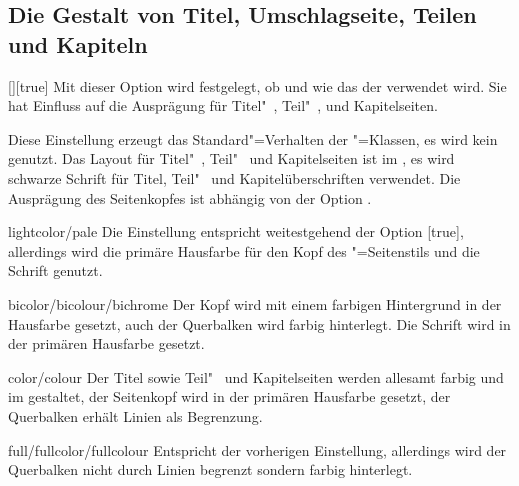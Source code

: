 \subsection{Die Gestalt von Titel, Umschlagseite, Teilen und Kapiteln}
\begin{Declaration}{[\PSet]}[true]
\printdeclarationlist%
%
%
Mit dieser Option wird festgelegt, ob und wie das \CD der \TnUD verwendet wird. 
Sie hat Einfluss auf die Ausprägung für Titel"~, Teil"~, und Kapitelseiten.
%
\begin{values}
\itemfalse
  Diese Einstellung erzeugt das Standard"=Verhalten der \KOMAScript"=Klassen, 
  es wird kein \CD genutzt.
  Das Layout für Titel"~, Teil"~ und Kapitelseiten ist im \CD, es wird 
  schwarze Schrift für Titel, Teil"~ und Kapitelüberschriften verwendet. Die 
  Ausprägung des Seitenkopfes ist abhängig von der Option .
\item[lightcolor/pale]
  Die Einstellung entspricht weitestgehend der Option [true], 
  allerdings wird die primäre Hausfarbe  für den Kopf des 
  "=Seitenstils und die Schrift genutzt.
\item[bicolor/bicolour/bichrome]
   Der Kopf wird mit einem farbigen Hintergrund in der 
  Hausfarbe gesetzt, auch der Querbalken wird farbig hinterlegt. Die Schrift 
  wird in der primären Hausfarbe gesetzt.
\item[color/colour]
  Der Titel sowie Teil"~ und Kapitelseiten werden allesamt farbig und im \CD 
  gestaltet, der Seitenkopf wird in der primären Hausfarbe  
  gesetzt, der Querbalken erhält Linien als Begrenzung.
\item[full/fullcolor/fullcolour]
   Entspricht der vorherigen Einstellung, allerdings wird der 
  Querbalken nicht durch Linien begrenzt sondern farbig hinterlegt.
\end{values}
\end{Declaration}

